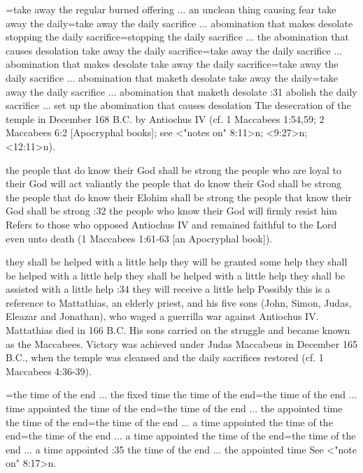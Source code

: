 ={take away the regular burned offering ... an unclean thing causing fear} %
    {take away the daily}={take away the daily sacrifice ... abomination that makes desolate} %
    {stopping the daily sacrifice}={stopping the daily sacrifice ... the abomination that causes desolation} %
    {take away the daily sacrifice}={take away the daily sacrifice ... abomination that makes desolate} %
    {take away the daily sacrifice}={take away the daily sacrifice ... abomination that maketh desolate} %
    {take away the daily}={take away the daily sacrifice ... abomination that maketh desolate} %
:31 {abolish the daily sacrifice ... set up the abomination 
that causes desolation} The desecration of the temple in December 168 B.C. by Antiochus IV (cf. 1
Maccabees 1:54,59; 2 Maccabees 6:2 [Apocryphal books]; see <"notes on" 8:11>n; <9:27>n; <12:11>n).

    {the people that do know their God shall be strong} %
    {the people who are loyal to their God will act valiantly} %
    {the people that do know their God shall be strong} %
    {the people that do know their Elohim shall be strong} %
    {the people that know their God shall be strong} %
:32 {the people who know their God will firmly resist him} 
Refers to those who opposed Antiochus IV and remained faithful to the Lord even unto death (1
Maccabees 1:61-63 [an Apocryphal book]).

    {they shall be helped with a little help} %
    {they will be granted some help} %
    {they shall be helped with a little help} %
    {they shall be helped with a little help} %
    {they shall be assisted with a little help} %
:34 {they will receive a little help} Possibly this is a reference 
to Mattathias, an elderly priest, and his five sons (John, Simon, Judas, Eleazar and Jonathan), who waged a guerrilla war against Antiochus IV. 
Mattathias died in 166 B.C. His sons carried on the struggle and became known as the Maccabees. Victory was achieved under Judas Maccabeus in December 165 B.C., when the temple was cleansed and the daily sacrifices restored (cf. 1 Maccabees 4:36-39).

={the time of the end ... the fixed time} %
    {the time of the end}={the time of the end ... time appointed} %
    {the time of the end}={the time of the end ... the appointed time} %
    {the time of the end}={the time of the end ... a time appointed} %
    {the time of the end}={the time of the end ... a time appointed} %
    {the time of the end}={the time of the end ... a time appointed} %
:35 {the time of the end ... the appointed time} See <"note on" 8:17>n.

